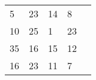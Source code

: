 \begin{tabular}{|l|l|l|l|l}
\cline{1-4}
5  & 23 & 14 & 8  &  \\ \cline{1-4}
10 & 25 & 1  & 23 &  \\ \cline{1-4}
35 & 16 & 15 & 12 &  \\ \cline{1-4}
16 & 23 & 11 & 7  &  \\ \cline{1-4}
\end{tabular}
